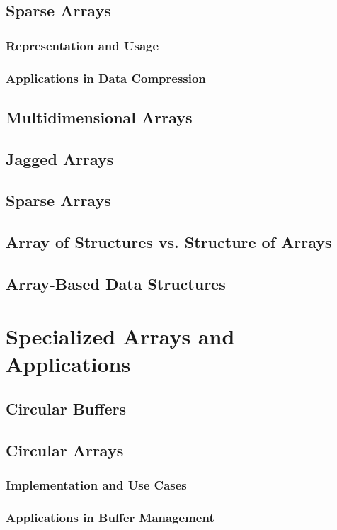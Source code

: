 \documentclass{book}
\begin{document}
	\section{Sparse Arrays}
	\subsection{Representation and Usage}
	\subsection{Applications in Data Compression}
	\section{Multidimensional Arrays}
	\section{Jagged Arrays}
	\section{Sparse Arrays}
	\section{Array of Structures vs. Structure of Arrays}
	\section{Array-Based Data Structures}
		
\chapter{Specialized Arrays and Applications}
	\section{Circular Buffers}
	\section{Circular Arrays}
	\subsection{Implementation and Use Cases}
	\subsection{Applications in Buffer Management}
	
\end{document}
